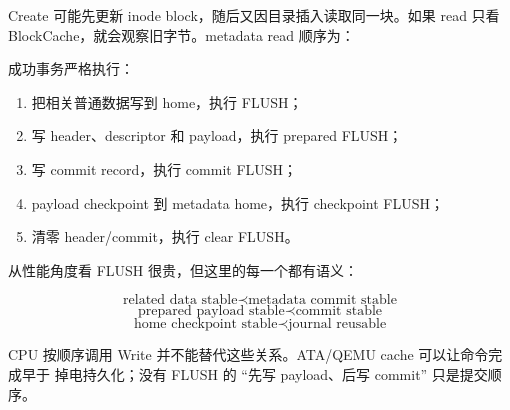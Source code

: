 Create 可能先更新 inode block，随后又因目录插入读取同一块。如果 read 只看
BlockCache，就会观察旧字节。metadata read 顺序为：

\begin{center}
\end{center}

成功事务严格执行：

\begin{enumerate}
  \item 把相关普通数据写到 home，执行 FLUSH；
  \item 写 header、descriptor 和 payload，执行 prepared FLUSH；
  \item 写 commit record，执行 commit FLUSH；
  \item payload checkpoint 到 metadata home，执行 checkpoint FLUSH；
  \item 清零 header/commit，执行 clear FLUSH。
\end{enumerate}

从性能角度看 FLUSH 很贵，但这里的每一个都有语义：

\[
\text{related data stable}
\prec
\text{metadata commit stable}
\]
\[
\text{prepared payload stable}
\prec
\text{commit stable}
\]
\[
\text{home checkpoint stable}
\prec
\text{journal reusable}
\]

CPU 按顺序调用 Write 并不能替代这些关系。ATA/QEMU cache 可以让命令完成早于
掉电持久化；没有 FLUSH 的 ``先写 payload、后写 commit'' 只是提交顺序。

